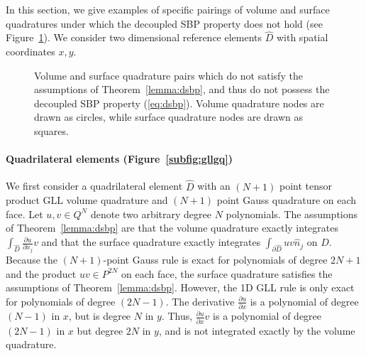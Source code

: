 \documentclass{svjour3}                     %
\renewcommand{\hat}{\widehat}
\newcommand{\pd}[2]{\frac{\partial#1}{\partial#2}}
\begin{document}
In this section, we give examples of specific pairings of volume and surface quadratures under which the decoupled SBP property does not hold (see Figure~\ref{fig:sbploss}).  We consider two dimensional reference elements $\hat{D}$ with spatial coordinates $x,y$.
\begin{figure}
\centering
{}
\hspace{2em}
\caption{Volume and surface quadrature pairs which do not satisfy the assumptions of Theorem~\ref{lemma:dsbp}, and thus do not possess the decoupled SBP property (\ref{eq:dsbp}). Volume quadrature nodes are drawn as circles, while surface quadrature nodes are drawn as squares.}
\label{fig:sbploss}
\end{figure}

\paragraph{Quadrilateral elements (Figure~\ref{subfig:gllgq})} We first consider a quadrilateral element $\hat{D}$ with an $(N+1)$ point tensor product GLL volume quadrature and $(N+1)$ point Gauss quadrature on each face.  Let $u,v \in Q^N$ denote two arbitrary degree $N$ polynomials.  The assumptions of Theorem~\ref{lemma:dsbp} are that the volume quadrature exactly integrates $\int_{\hat{D}} \pd{u}{x_j} v$ and that the surface quadrature exactly integrates $\int_{\partial \hat{D}} u v \hat{n}_j$ on $\hat{D}$.  Because the $(N+1)$-point Gauss rule is exact for polynomials of degree $2N+1$ and the product $uv \in P^{2N}$ on each face, the surface quadrature satisfies the assumptions of Theorem~\ref{lemma:dsbp}.  However, the 1D GLL rule is only exact for polynomials of degree $(2N-1)$.  The derivative $\pd{u}{x}$ is a polynomial of degree $(N-1)$ in $x$, but is degree $N$ in $y$.  Thus, $\pd{u}{x}v$ is a polynomial of degree $(2N-1)$ in $x$ but degree $2N$ in $y$, and is not integrated exactly by the volume quadrature.  
\end{document}
